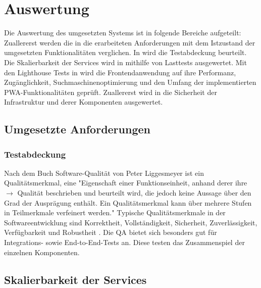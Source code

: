 \chapter{Auswertung}
\label{chap:auswertung}
Die Auswertung des umgesetzten Systems ist in folgende Bereiche aufgeteilt:
Zuallererst werden die in  die erarbeiteten Anforderungen
mit dem Istzustand der umgesetzten Funktionalitäten verglichen. In 
wird die Testabdeckung beurteilt. Die Skalierbarkeit der Services wird in 
mithilfe von Lasttests ausgewertet. Mit den Lighthouse Tests in  wird die Frontendanwendung
auf ihre Performanz, Zugänglichkeit, Suchmaschinenoptimierung und den Umfang der implementierten PWA-Funktionalitäten geprüft.
Zuallererst wird in  die Sicherheit der Infrastruktur und derer Komponenten ausgewertet.

\section{Umgesetzte Anforderungen}
\label{sec:umgesetzteanforderungen}

\subsection{Testabdeckung}
\label{subsec:testabdeckung}


Nach dem Buch Software-Qualität von Peter Liggesmeyer
ist ein Qualitätsmerkmal, eine "Eigenschaft einer Funktionseinheit, anhand derer ihre \(\rightarrow\)
Qualität beschrieben und beurteilt wird, die jedoch keine Aussage über
den Grad der Ausprägung enthält. Ein Qualitätsmerkmal kann über mehrere Stufen in Teilmerkmale
verfeinert werden."\cite[S. 515]{SoftwareQualitaet} Typische Qualitätsmerkmale in der Softwareentwicklung
sind Korrektheit, Vollständigkeit, Sicherheit, Zuverlässigkeit, Verfügbarkeit und Robustheit \cite[S. 5]{SoftwareQualitaet}.
Die QA bietet sich besonders gut für Integrations- sowie End-to-End-Tests an. Diese testen
das Zusammenspiel der einzelnen Komponenten.



\section{Skalierbarkeit der Services}
\label{sec:skalierbarkeitderservices}

